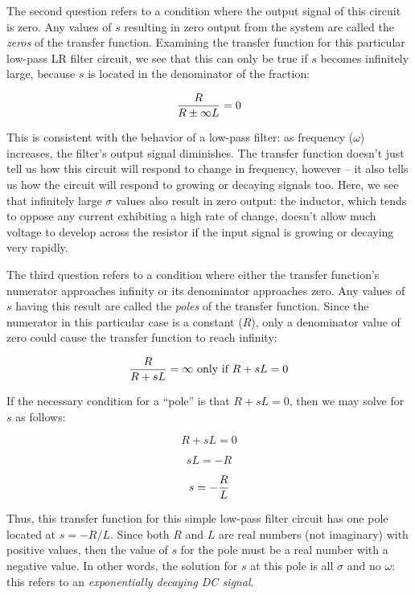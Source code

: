 \filbreak

The second question refers to a condition where the output signal of this circuit is zero.  Any values of $s$ resulting in zero output from the system are called the \textit{zeros} of the transfer function.  Examining the transfer function for this particular low-pass LR filter circuit, we see that this can only be true if $s$ becomes infinitely large, because $s$ is located in the denominator of the fraction:    

$${R \over {R \pm \infty L}} = 0$$

This is consistent with the behavior of a low-pass filter: as frequency ($\omega$) increases, the filter's output signal diminishes.  The transfer function doesn't just tell us how this circuit will respond to change in frequency, however -- it also tells us how the circuit will respond to growing or decaying signals too.  Here, we see that infinitely large $\sigma$ values also result in zero output: the inductor, which tends to oppose any current exhibiting a high rate of change, doesn't allow much voltage to develop across the resistor if the input signal is growing or decaying very rapidly.

\vskip 10pt

The third question refers to a condition where either the transfer function's numerator approaches infinity or its denominator approaches zero.  Any values of $s$ having this result are called the \textit{poles} of the transfer function.  Since the numerator in this particular case is a constant ($R$), only a denominator value of zero could cause the transfer function to reach infinity:     

$${R \over {R + sL}} = \infty \hbox{ only if } R + sL = 0$$

If the necessary condition for a ``pole'' is that $R + sL = 0$, then we may solve for $s$ as follows:

$$R + sL = 0$$

$$sL = -R$$

$$s = -{R \over L}$$

Thus, this transfer function for this simple low-pass filter circuit has one pole located at $s = - R / L$.  Since both $R$ and $L$ are real numbers (not imaginary) with positive values, then the value of $s$ for the pole must be a real number with a negative value.  In other words, the solution for $s$ at this pole is all $\sigma$ and no $\omega$: this refers to an \textit{exponentially decaying DC signal}.

